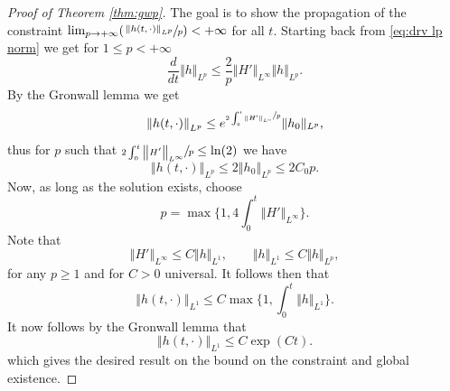 \documentclass[10pt]{amsart}
\newcommand{\Psfrac}[2]{(\sfrac{#1}{#2})}
\theoremstyle{plain}
\theoremstyle{definition}
\begin{document}

\begin{proof}[Proof of Theorem \ref{thm:gwp}]
The goal is to show the propagation of the constraint $\lim_{p\to+\infty}\Psfrac{\left \Vert h(t,\cdot)\right\Vert_{L^p}}{p}<+\infty$ for all $t$. Starting back from \eqref{eq:drv lp norm} we get for $1\leq p<+\infty$
\[
\frac{d}{dt}\Vert h\Vert_{L^{p}}\leq \frac{2}{p}\left\Vert H'\right\Vert_{L^{\infty}}\Vert h\Vert_{L^{p}}.
\]
By the Gronwall lemma we get
\[
\left\Vert h(t,\cdot)\right\Vert_{L^{p}}\leq e^{\sfrac{2\int_0^t\left\Vert H'\right\Vert_{L^{\infty}}}{p}}\Vert h_0\Vert_{L^{p}},
\]
thus for $p$ such that $\sfrac{2\int_0^t\left\Vert H'\right\Vert_{L^{\infty}}}{p}\leq \ln(2)$ we have
\[
\left\Vert h(t,\cdot)\right\Vert_{L^{p}}\leq 2 \left\Vert h_0\right\Vert_{L^{p}}\leq 2C_0 p.
\]
Now, as long as the solution exists, choose
\[\textstyle
p=\max\{1,4\int_0^t \left\Vert H'\right\Vert_{L^\infty}\}.
\]
Note that
\[
\left\Vert H' \right\Vert_{L^\infty}\leq C \Vert h\Vert_{L^1},\qquad \Vert h\Vert_{L^1}\leq C\Vert h\Vert_{L^{p}},
\]
for any $p\geq 1$ and for $C>0$ universal.
It follows then that\vspace*{-3pt}
\[\textstyle
\left\Vert h(t,\cdot)\right\Vert_{L^1}\leq C \max\{1,\int_{0}^t\Vert h\Vert_{L^1}\}.
\]
It now follows by the Gronwall lemma that\vspace*{-3pt}\enlargethispage{\baselineskip}
\[
\left\Vert h(t,\cdot)\right\Vert_{L^1}\leq C\exp(Ct).
\]
which gives the desired result on the bound on the constraint and global existence.
\end{proof}

\label{sec:cvg moll}
\end{document}
